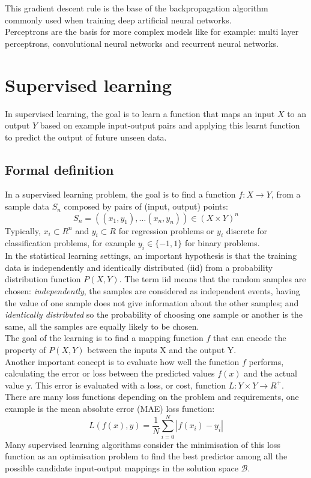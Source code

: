 This gradient descent rule is the base of the backpropagation algorithm commonly used when training deep artificial neural networks.\\

Perceptrons are the basis for more complex models like for example: multi layer perceptrons, convolutional neural networks and recurrent neural networks.

\section{Supervised learning}
\label{sec:sl}
In supervised learning, the goal is to learn a function that maps an input $X$ to an output $Y$ based on example input-output pairs and applying this learnt function to predict the output of future unseen data.

\subsection{Formal definition}
\label{ssec:formdefSL}

In a supervised learning problem, the goal is to find a function $f : X \rightarrow Y$, from a sample data $S_n$ composed by pairs of (input, output) points:
\[
S_n = ((x_1,y_1),\dots(x_n,y_n)) \in (X \times Y)^n
\]
Typically, $x_i \subset R^n$ and $y_i \subset R$ for regression problems or $y_i$ discrete for classification problems, for example $y_i \in \{-1,1\}$ for binary problems. \\

In the statistical learning settings, an important hypothesis is that the training data is independently and identically distributed (\gls{iid}) from a probability distribution function $P(X,Y)$. The term \gls{iid} means that the random samples are chosen: \emph{independently}, the samples are considered as independent events, having the value of one sample does not give information about the other samples; and \emph{identically distributed} so the probability of choosing one sample or another is the same, all the samples are equally likely to be chosen.\\ The goal of the learning is to find a mapping function $f$ that can encode the property of $P(X,Y)$ between the inputs X and the output Y. \\

Another important concept is to evaluate how well the function $f$ performs, calculating the error or loss between the predicted values $f(x)$ and the actual value y. This error is evaluated with a loss, or cost, function $L: Y \times Y \rightarrow R^+$. There are many loss functions depending on the problem and requirements, one example is the mean absolute error (\gls{MAE}) loss function:
\[
L(f(x),y)= \frac{1}{N} \sum_{i=0}^{N} |f(x_i)-y_i| 
\]
Many supervised learning algorithms consider the minimisation
of this loss function as an optimisation problem to find the best predictor among all the possible candidate input-output mappings in the solution space $\mathcal{B}$. \\

